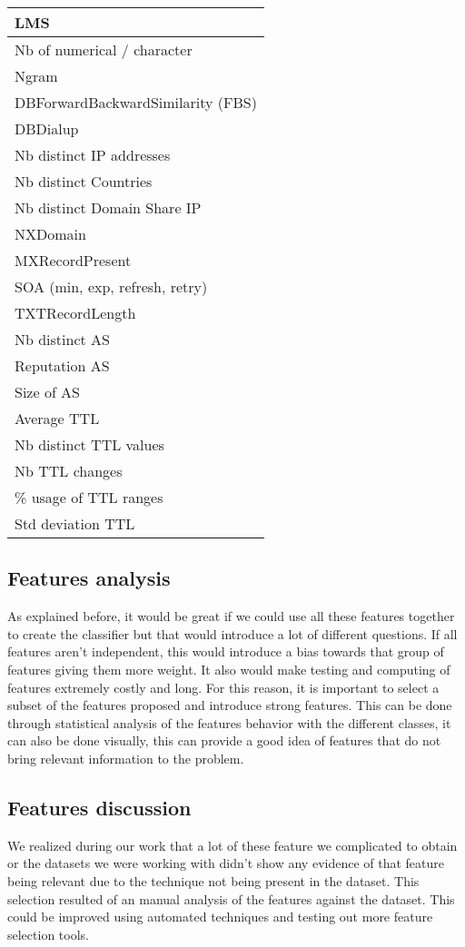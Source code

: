 \begin{tabular}{|l|}
\hline
LMS\\
\hline
Nb of numerical / character\\
\hline
Ngram\\
\hline
DBForwardBackwardSimilarity (FBS)\\
\hline
DBDialup\\
\hline
Nb distinct IP addresses\\
\hline
Nb distinct Countries\\
\hline
Nb distinct Domain Share IP\\
\hline
NXDomain\\
\hline
MXRecordPresent\\
\hline
SOA (min, exp, refresh, retry)\\
\hline
TXTRecordLength\\
\hline
Nb distinct AS\\
\hline
Reputation AS\\
\hline
Size of AS\\
\hline
Average TTL\\
\hline
Nb distinct TTL values\\
\hline
Nb TTL changes\\
\hline
\% usage of TTL ranges\\
\hline
Std deviation TTL\\
\hline
\end{tabular}

\subsection{Features analysis}
As explained before, it would be great if we could use all these features together to create the classifier but that would introduce a lot of different questions. If all features aren't independent, this would introduce a bias towards that group of features giving them more weight. It also would make testing and computing of features extremely costly and long. For this reason, it is important to select a subset of the features proposed and introduce strong features. This can be done through statistical analysis of the features behavior with the different classes, it can also be done visually, this can provide a good idea of features that do not bring relevant information to the problem. %
\subsection{Features discussion}
We realized during our work that a lot of these feature we complicated to obtain or the datasets we were working with didn't show any evidence of that feature being relevant due to the technique not being present in the dataset. This selection resulted of an manual analysis of the features against the dataset. This could be improved using automated techniques and testing out more feature selection tools.
